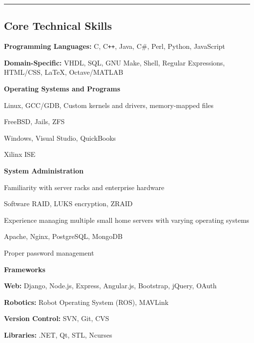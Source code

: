 \documentclass[10pt,letterpaper]{article}
\begin{document}
\hrule
\vspace{-0.4em}
\subsection*{Core Technical Skills}
\begin{itemize*}
    \item \textbf{Programming Languages:} C, C\texttt{++}, Java, C\#, Perl,
            Python, JavaScript
    \item \textbf{Domain-Specific:} VHDL, SQL, GNU Make, Shell, Regular
            Expressions, HTML/CSS, \LaTeX, Octave/MATLAB
    \item \textbf{Operating Systems and Programs}
        \begin{itemize*}
            \item Linux, GCC/GDB, Custom kernels and drivers, memory-mapped files
            \item FreeBSD, Jails, ZFS
            \item Windows, Visual Studio, QuickBooks
            \item Xilinx ISE
        \end{itemize*}
    \item \textbf{System Administration}
        \begin{itemize*}
            \item Familiarity with server racks and enterprise hardware
            \item Software RAID, LUKS encryption, ZRAID
            \item Experience managing multiple small home servers with varying
                operating systems
            \item Apache, Nginx, PostgreSQL, MongoDB
            \item Proper password management
        \end{itemize*}
    \item \textbf{Frameworks}
        \begin{itemize*}
            \item \textbf{Web:} Django, Node.js, Express, Angular.js, Bootstrap,
                    jQuery, OAuth
            \item \textbf{Robotics:} Robot Operating System (ROS), MAVLink
            \item \textbf{Version Control:} SVN, Git, CVS
            \item \textbf{Libraries:} .NET, Qt, STL, Ncurses
        \end{itemize*}

\end{itemize*}
\end{document}
